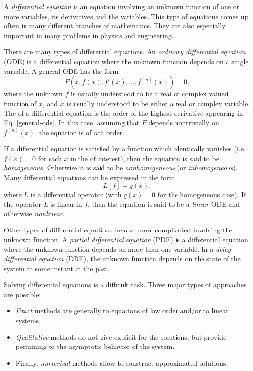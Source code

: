 \documentclass[12pt]{article}
\begin{document}
A {\em differential equation} is an equation involving an unknown function
of one or more variables, its derivatives and the
 variables.
This type of equations comes up often in many different branches of
mathematics. They are also especially important in many problems in
physics and engineering.

There are many types of differential equations. An {\em ordinary differential
equation} (ODE) is a differential equation where the unknown function depends
on a single variable. A general ODE has the form
\begin{equation}
 \label{general-ode}
 F(x, f(x),f'(x),\ldots,f^{(n)}(x))=0,
\end{equation}
where the unknown $f$ is usually understood to be a real or complex valued function of $x$, and $x$ is usually understood to be either a real or complex
variable.
The {\em {}}
of a differential equation is the order of the highest derivative appearing
in Eq. \eqref{general-ode}. In this case, assuming that $F$ depends
nontrivially on $f^{(n)}(x)$, the equation is of $n$th order.

If a differential equation is satisfied by a function which
identically vanishes (i.e. $f(x)=0$ for each $x$ in the
 of interest),
then the equation is said to be {\em homogeneous}. Otherwise it is said to be
{\em nonhomogeneous} (or {\em inhomogeneous}). Many differential equations
can be expressed in the form \[ L[f] = g(x), \] where $L$ is a differential
operator (with $g(x)=0$ for the homogeneous case). If the operator $L$ is
linear in $f$, then the equation is said to be a {\em linear} ODE and
otherwise {\em nonlinear}.

Other types of differential equations involve more complicated  involving the unknown function.
A {\em partial differential equation} (PDE) is a differential equation
where the unknown function depends on more than one variable. In a {\em delay differential equation} (DDE), the unknown function depends on the state of the system at some instant in the past.

Solving differential equations is a difficult task. Three major types of approaches are possible:
\begin{itemize}
\item {\em Exact} methods are generally  to equations of low order  and/or to linear systems. 
\item {\em Qualitative} methods do not give explicit  for the solutions, but provide  pertaining to the asymptotic behavior of the system.
\item Finally, {\em numerical} methods allow to construct approximated solutions.
\end{itemize}
\end{document}
